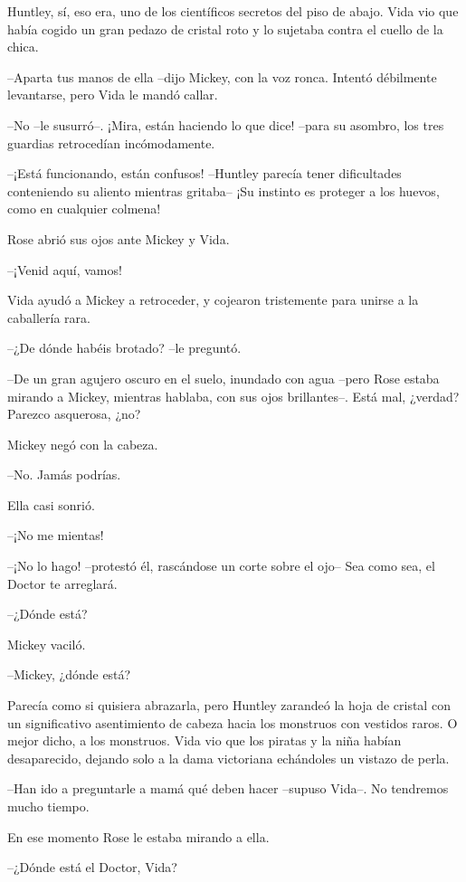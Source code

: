 {Huntley, sí, eso era, uno de los científicos secretos del piso de
 abajo. Vida vio que había cogido un gran pedazo de cristal roto y lo
sujetaba contra el cuello de la chica.}

{--Aparta tus manos de ella --dijo Mickey, con la voz ronca. Intentó
débilmente levantarse, pero Vida le mandó callar.}

{--No --le susurró--. ¡Mira, están haciendo lo que dice! --para su
asombro, los tres guardias retrocedían incómodamente.}

{--¡Está funcionando, están confusos! --Huntley parecía tener
 dificultades conteniendo su aliento mientras gritaba-- ¡Su instinto es
proteger a los huevos, como en cualquier colmena!}

{Rose abrió sus ojos ante Mickey y Vida.}

{--¡Venid aquí, vamos!}

{Vida ayudó a Mickey a retroceder, y cojearon tristemente para unirse a
la caballería rara.}

{--¿De dónde habéis brotado? --le preguntó.}

{--De un gran agujero oscuro en el suelo, inundado con agua --pero Rose
 estaba mirando a Mickey, mientras hablaba, con sus ojos brillantes--.
Está mal, ¿verdad? Parezco asquerosa, ¿no?}

{Mickey negó con la cabeza.}

{--No. Jamás podrías.}

{Ella casi sonrió.}

{--¡No me mientas!}

{--¡No lo hago! --protestó él, rascándose un corte sobre el ojo-- Sea
como sea, el Doctor te arreglará.}

{--¿Dónde está?}

{Mickey vaciló.}

{--Mickey, ¿dónde está?}

{Parecía como si quisiera abrazarla, pero Huntley zarandeó la hoja de
 cristal con un significativo asentimiento de cabeza hacia los monstruos
 con vestidos raros. O mejor dicho, a los monstruos. Vida vio que los
 piratas y la niña habían desaparecido, dejando solo a la dama victoriana
echándoles un vistazo de perla.}

{--Han ido a preguntarle a mamá qué deben hacer --supuso Vida--. No
tendremos mucho tiempo.}

{En ese momento Rose le estaba mirando a ella.}

{--¿Dónde está el Doctor, Vida?}

